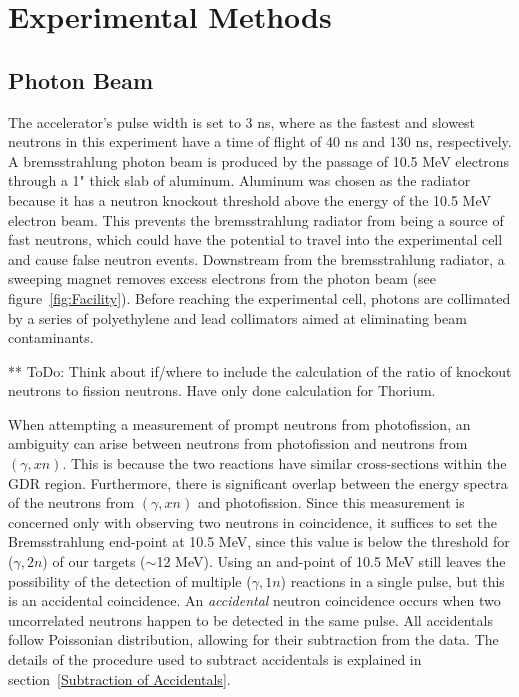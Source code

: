 \section{Experimental Methods}
\subsection{Photon Beam}
The accelerator's pulse width is set to 3 ns, where as the fastest and slowest neutrons in this experiment have a time of flight of 40 ns and 130 ns, respectively.
A bremsstrahlung photon beam is produced by the passage of 10.5 MeV electrons through a 1" thick slab of aluminum.
Aluminum was chosen as the radiator because it has a neutron knockout threshold above the energy of the 10.5 MeV electron beam.
This prevents the bremsstrahlung radiator from being a source of fast neutrons, which could have the potential to travel into the experimental cell and cause false neutron events.
Downstream from the bremsstrahlung radiator, a sweeping magnet removes excess electrons from the photon beam (see figure~\ref{fig:Facility}).
Before reaching the experimental cell, photons are collimated by a series of polyethylene and lead collimators aimed at eliminating beam contaminants.

** ToDo: Think about if/where to include the calculation of the ratio of knockout neutrons to fission neutrons.
Have only done calculation for Thorium.

When attempting a measurement of prompt neutrons from photofission, an ambiguity can arise between neutrons from photofission and neutrons from $(\gamma, xn)$.
This is because the two reactions have similar cross-sections within the GDR region.
Furthermore, there is significant overlap between the energy spectra of the neutrons from $(\gamma, xn)$ and photofission.
Since this measurement is concerned only with observing two neutrons in coincidence, it suffices to set the Bremsstrahlung end-point at 10.5 MeV, since this value is below the threshold for ($\gamma, 2n$) of our targets ($\sim$12 MeV).
Using an and-point of 10.5 MeV still leaves the possibility of the detection of multiple ($\gamma, 1n$) reactions in a single pulse, but this is an accidental coincidence.
An \textit{accidental} neutron coincidence occurs when two uncorrelated neutrons happen to be detected in the same pulse.
All accidentals follow Poissonian distribution, allowing for their subtraction from the data.
The details of the procedure used to subtract accidentals is explained in section~\ref{Subtraction of Accidentals}.

